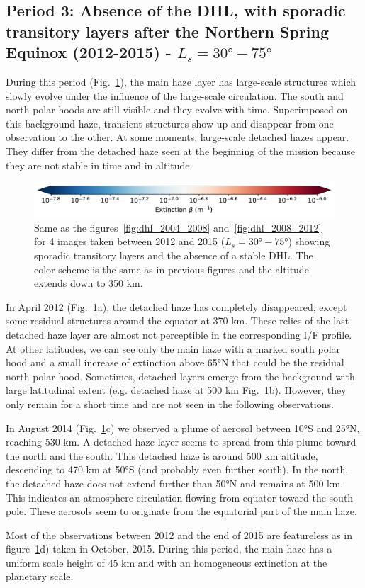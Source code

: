 \subsection{Period 3: Absence of the DHL, with sporadic transitory layers after the Northern Spring Equinox (2012-2015) - $L_s=\ang{30}-\ang{75}$}

During this period (Fig.~\ref{fig:dhl_2012_2015}), the main haze layer has large-scale structures which slowly evolve under the influence of the
large-scale circulation. The south and north polar hoods are still visible and they evolve
with time. Superimposed on this background haze, transient structures show up and disappear from one observation
to the other. At some moments, large-scale detached hazes appear. They differ from the detached haze seen at the
beginning of the mission because they are not stable in time and in altitude.

\begin{figure}[!ht]
\includegraphics[width=.5\textwidth]{Fig/Extinction_colorbar}
\caption{Same as the figures~\ref{fig:dhl_2004_2008} and~\ref{fig:dhl_2008_2012}
for 4 images taken between 2012 and 2015 ($L_s=\ang{30}-\ang{75}$) showing sporadic
transitory layers and the absence of a stable DHL.
The color scheme is the same as in previous figures and the altitude extends down to 350 km.}
\label{fig:dhl_2012_2015}
\end{figure}

In April 2012 (Fig.~\ref{fig:dhl_2012_2015}a), the detached haze has completely disappeared, except some residual
structures around the equator at 370 km.
These relics of the last detached haze layer are almost not perceptible in the corresponding I/F profile. At other
latitudes, we can see only the main haze with a marked south polar hood and a small increase of extinction above
\ang{65}N that could be the residual north polar hood. Sometimes, detached layers emerge from the background with large latitudinal
extent (e.g. detached haze at 500 km Fig.~\ref{fig:dhl_2012_2015}b). However, they only remain for a short time
and are not seen in the following observations.

In August 2014 (Fig.~\ref{fig:dhl_2012_2015}c) we observed a plume of aerosol between \ang{10}S and \ang{25}N,
reaching 530 km. A detached haze layer seems to spread from this plume toward the north and the south. This
detached haze is around 500 km altitude, descending to 470 km at \ang{50}S (and probably even further south). In the
north, the detached haze does not extend further than \ang{50}N and remains at 500 km. This indicates an
atmosphere circulation flowing from equator toward the south pole. These aerosols seem to originate
from the equatorial part of the main haze.

Most of the observations between 2012 and the end of 2015 are featureless as in figure~\ref{fig:dhl_2012_2015}d)
taken in October, 2015. During this period, the main haze has a uniform scale height of 45 km and
with an homogeneous extinction at the planetary scale.
